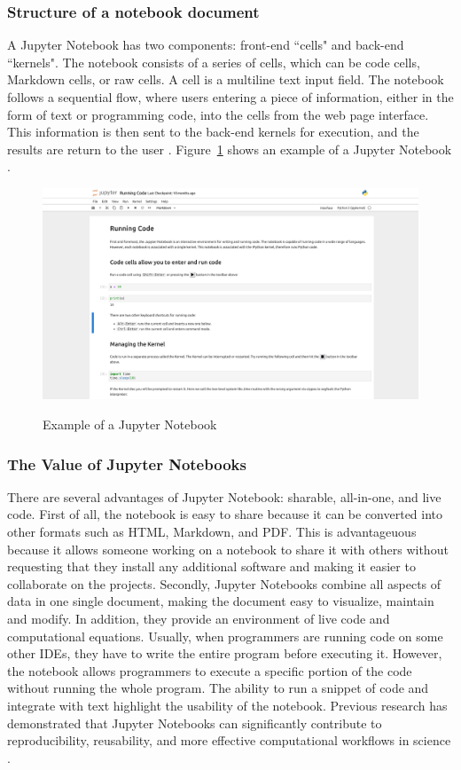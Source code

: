 \subsubsection{Structure of a notebook document}
A Jupyter Notebook has two components: front-end ``cells" and back-end 
``kernels". The notebook consists of a series of cells, which can be code 
cells, Markdown cells, or raw cells. A cell is a multiline text input field. 
The notebook follows a sequential flow, where users entering a piece of 
information, either in the form of text or programming code, into the cells 
from the web page interface. This information is then sent to the back-end 
kernels for execution, and the results are return to the user 
\cite{notebookdoc}. Figure~\ref{fig:running_code} shows an example of a
Jupyter Notebook \cite{jupyternotebookrep}.

\begin{figure}[h!]
	\caption{Example of a Jupyter Notebook}
	\includegraphics[width=1\textwidth]{figures/running_code.png}
	\label{fig:running_code}
\end{figure}

\subsubsection{The Value of Jupyter Notebooks}
There are several advantages of Jupyter Notebook: sharable, all-in-one, and 
live code. First of all, the notebook is easy to share because it can be 
converted into other formats such as HTML, Markdown, and PDF. This is 
advantageuous because it allows someone working on a notebook to share it with 
others without requesting that they install any additional software and making 
it easier to collaborate on the projects. Secondly, Jupyter Notebooks combine 
all aspects of data in one single document, making the document easy to 
visualize, maintain and modify. In addition, they provide an environment of 
live code and computational equations. Usually, when programmers are running 
code on some other IDEs, they have to write the entire program before executing 
it. However, the notebook allows programmers to execute a specific portion of 
the code without running the whole program. The ability to run a snippet of 
code and integrate with text highlight the usability of the notebook. Previous 
research has demonstrated that Jupyter Notebooks can significantly contribute 
to reproducibility, reusability, and more effective computational workflows in 
science \cite{beg2021using}.

